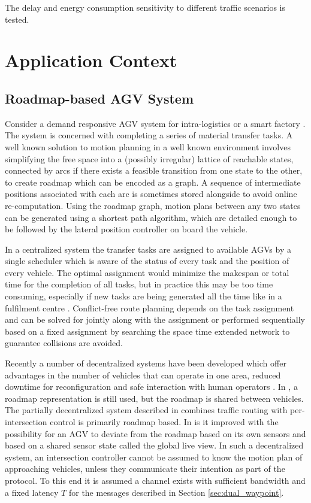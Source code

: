 The delay and energy consumption sensitivity to different traffic scenarios is tested.  

\section{Application Context}
\subsection{Roadmap-based AGV System}
Consider a demand responsive AGV system for intra-logistics \cite{Boysen2019} or a smart factory \cite{Dotoli2019}. The system is concerned with completing a series of material transfer tasks. 
A well known solution to motion planning in a well known environment involves simplifying the free space into a (possibly irregular) lattice of reachable states, connected by arcs if there exists a feasible transition from one state to the other, to create  roadmap which can be encoded as a graph. A sequence of intermediate positions associated with each arc is sometimes stored alongside to avoid online re-computation. Using the roadmap graph, motion plans between any two states can be generated using a shortest path algorithm, which are detailed enough to be followed by the lateral position controller on board the vehicle. 

In a centralized system the transfer tasks are assigned to available AGVs by a single scheduler which is aware of the status of every task and the position of every vehicle. The optimal assignment would minimize the makespan or total time for the completion of all tasks, but in practice this may be too time consuming, especially if new tasks are being generated all the time like in a fulfilment centre \cite{Azadeh2019}. Conflict-free route planning depends on the task assignment and can be solved for jointly along with the assignment or performed sequentially based on a fixed assignment by searching the space time extended network to guarantee collisions are avoided.

Recently a number of decentralized systems have been developed which offer advantages in the number of vehicles that can operate in one area, reduced downtime for reconfiguration and safe interaction with human operators \cite{Fragapane2021} . In \cite{Walenta2017}, a roadmap representation is still used, but the roadmap is shared between vehicles. The partially decentralized system described in \cite{Digani2014coord} combines traffic routing with per-intersection control is primarily roadmap based. In \cite{Cardarelli2017} is it improved with the possibility for an AGV to deviate from the roadmap based on its own sensors and based on a shared sensor state called the global live view. In such a decentralized system, an intersection controller cannot be assumed to know the motion plan of approaching vehicles, unless they communicate their intention as part of the protocol. To this end it is assumed a channel exists with sufficient bandwidth and a fixed latency $T$ for the messages described in Section \ref{sec:dual_waypoint}.

